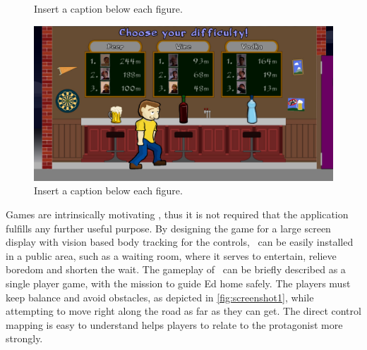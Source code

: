\documentclass{chi-ext}
\begin{document}
{\begin{figure}
  \caption{Insert a caption below each figure.}
  \label{fig:screenshot3}
\end{figure}
\begin{figure}
  \centering
  \includegraphics[width=\linewidth]{pictures/screenshot2.jpg}
  \caption{Insert a caption below each figure.}
  \label{fig:screenshot4}
\end{figure}
}
Games are intrinsically motivating \cite{salen2004rules} \cite{malone1981motivation}, thus it is not required that the application fulfills any further useful purpose. By designing the game for a large screen display with vision based body tracking for the controls, \drunkened\ can be easily installed in a public area, such as a waiting room, where it serves to entertain, relieve boredom and shorten the wait.
The gameplay of \drunkened\ can be briefly described as a single player game, with the mission to guide Ed home safely. The players must keep balance and avoid obstacles, as depicted in \autoref{fig:screenshot1}, while attempting to move right along the road as far as they can get. The direct control mapping is easy to understand helps players to relate to the protagonist more strongly.
\end{document}
